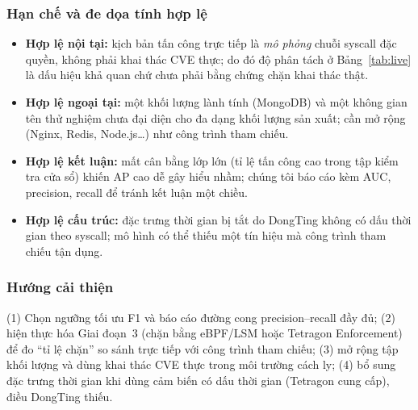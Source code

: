 \subsubsection{Hạn chế và đe dọa tính hợp lệ}
\begin{itemize}[leftmargin=1.6em]
  \item \textbf{Hợp lệ nội tại:} kịch bản tấn công trực tiếp là \emph{mô phỏng}
        chuỗi syscall đặc quyền, không phải khai thác CVE thực; do đó độ phân tách
        ở Bảng~\ref{tab:live} là dấu hiệu khả quan chứ chưa phải bằng chứng chặn
        khai thác thật.
  \item \textbf{Hợp lệ ngoại tại:} một khối lượng lành tính (MongoDB) và một không
        gian tên thử nghiệm chưa đại diện cho đa dạng khối lượng sản xuất; cần mở
        rộng (Nginx, Redis, Node.js\dots) như công trình tham chiếu.
  \item \textbf{Hợp lệ kết luận:} mất cân bằng lớp lớn (tỉ lệ tấn công cao trong
        tập kiểm tra cửa sổ) khiến AP cao dễ gây hiểu nhầm; chúng tôi báo cáo kèm
        AUC, precision, recall để tránh kết luận một chiều.
  \item \textbf{Hợp lệ cấu trúc:} đặc trưng thời gian bị tắt do DongTing không có
        dấu thời gian theo syscall; mô hình có thể thiếu một tín hiệu mà công trình
        tham chiếu tận dụng.
\end{itemize}

\subsubsection{Hướng cải thiện}
(1) Chọn ngưỡng tối ưu F1 và báo cáo đường cong precision--recall đầy đủ;
(2) hiện thực hóa Giai đoạn~3 (chặn bằng eBPF/LSM hoặc Tetragon Enforcement) để đo
``tỉ lệ chặn'' so sánh trực tiếp với công trình tham chiếu; (3) mở rộng tập khối lượng và dùng
khai thác CVE thực trong môi trường cách ly; (4) bổ sung đặc trưng thời gian khi
dùng cảm biến có dấu thời gian (Tetragon cung cấp), điều DongTing thiếu.
